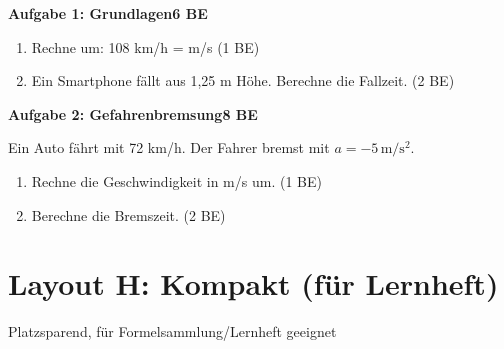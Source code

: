 \documentclass[11pt,a4paper]{article}
\begin{document}
\vspace{0.5cm}

\begin{tcolorbox}[
    colback=black!5,
    colframe=black!30,
    boxrule=0.5pt,
    arc=0pt,
    left=5pt, right=5pt, top=3pt, bottom=3pt
]
{\bfseries Aufgabe 1: Grundlagen}\hfill{\bfseries 6 BE}
\end{tcolorbox}

\vspace{0.3cm}
\begin{enumerate}
\item[a)] Rechne um: 108 km/h = \underline{\hspace{2cm}} m/s \hfill (1 BE)
\item[b)] Ein Smartphone fällt aus 1,25 m Höhe. Berechne die Fallzeit. \hfill (2 BE)
\end{enumerate}

\vspace{0.5cm}

\begin{tcolorbox}[
    colback=black!5,
    colframe=black!30,
    boxrule=0.5pt,
    arc=0pt,
    left=5pt, right=5pt, top=3pt, bottom=3pt
]
{\bfseries Aufgabe 2: Gefahrenbremsung}\hfill{\bfseries 8 BE}
\end{tcolorbox}

\vspace{0.3cm}
Ein Auto fährt mit 72 km/h. Der Fahrer bremst mit $a = -5\,\mathrm{m/s^2}$.

\begin{enumerate}
\item[a)] Rechne die Geschwindigkeit in m/s um. \hfill (1 BE)
\item[b)] Berechne die Bremszeit. \hfill (2 BE)
\end{enumerate}

\vspace{1cm}

\newpage
\section*{Layout H: Kompakt (für Lernheft)}
\vspace{-0.3cm}
{\small Platzsparend, für Formelsammlung/Lernheft geeignet}

\vspace{0.5cm}
\end{document}
